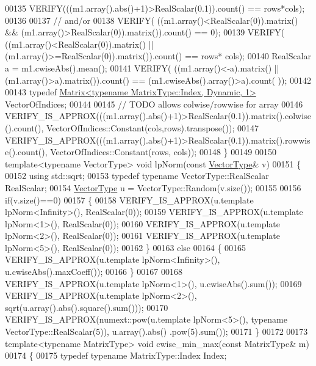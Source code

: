 \begin{DoxyCode}
00135   VERIFY(((m1.array().abs()+1)>RealScalar(0.1)).count() == rows*cols);
00136 
00137   \textcolor{comment}{// and/or}
00138   VERIFY( ((m1.array()<RealScalar(0)).matrix() && (m1.array()>RealScalar(0)).matrix()).count() == 0);
00139   VERIFY( ((m1.array()<RealScalar(0)).matrix() || (m1.array()>=RealScalar(0)).matrix()).count() == rows*
      cols);
00140   RealScalar a = m1.cwiseAbs().mean();
00141   VERIFY( ((m1.array()<-a).matrix() || (m1.array()>a).matrix()).count() == (m1.cwiseAbs().array()>a).count(
      ));
00142 
00143   \textcolor{keyword}{typedef} \hyperlink{group___core___module_class_eigen_1_1_matrix}{Matrix<typename MatrixType::Index, Dynamic, 1>} 
      VectorOfIndices;
00144 
00145   \textcolor{comment}{// TODO allows colwise/rowwise for array}
00146   VERIFY\_IS\_APPROX(((m1.array().abs()+1)>RealScalar(0.1)).matrix().colwise().count(), 
      VectorOfIndices::Constant(cols,rows).transpose());
00147   VERIFY\_IS\_APPROX(((m1.array().abs()+1)>RealScalar(0.1)).matrix().rowwise().count(), 
      VectorOfIndices::Constant(rows, cols));
00148 \}
00149 
00150 \textcolor{keyword}{template}<\textcolor{keyword}{typename} VectorType> \textcolor{keywordtype}{void} lpNorm(\textcolor{keyword}{const} \hyperlink{struct_vector_type}{VectorType}& v)
00151 \{
00152   \textcolor{keyword}{using} std::sqrt;
00153   \textcolor{keyword}{typedef} \textcolor{keyword}{typename} VectorType::RealScalar RealScalar;
00154   \hyperlink{struct_vector_type}{VectorType} u = VectorType::Random(v.size());
00155 
00156   \textcolor{keywordflow}{if}(v.size()==0)
00157   \{
00158     VERIFY\_IS\_APPROX(u.template lpNorm<Infinity>(), RealScalar(0));
00159     VERIFY\_IS\_APPROX(u.template lpNorm<1>(), RealScalar(0));
00160     VERIFY\_IS\_APPROX(u.template lpNorm<2>(), RealScalar(0));
00161     VERIFY\_IS\_APPROX(u.template lpNorm<5>(), RealScalar(0));
00162   \}
00163   \textcolor{keywordflow}{else}
00164   \{
00165     VERIFY\_IS\_APPROX(u.template lpNorm<Infinity>(), u.cwiseAbs().maxCoeff());
00166   \}
00167 
00168   VERIFY\_IS\_APPROX(u.template lpNorm<1>(), u.cwiseAbs().sum());
00169   VERIFY\_IS\_APPROX(u.template lpNorm<2>(), sqrt(u.array().abs().square().sum()));
00170   VERIFY\_IS\_APPROX(numext::pow(u.template lpNorm<5>(), \textcolor{keyword}{typename} VectorType::RealScalar(5)), u.array().abs()
      .pow(5).sum());
00171 \}
00172 
00173 \textcolor{keyword}{template}<\textcolor{keyword}{typename} MatrixType> \textcolor{keywordtype}{void} cwise\_min\_max(\textcolor{keyword}{const} MatrixType& m)
00174 \{
00175   \textcolor{keyword}{typedef} \textcolor{keyword}{typename} MatrixType::Index Index;

\end{DoxyCode}
